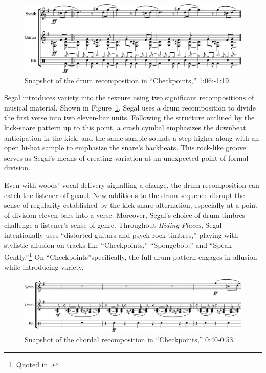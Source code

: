     \begin{figure}[ht]
        \centering
        \includegraphics[width=\textwidth]{images/figures/chp 02/106119checkpointsmain.pdf}
        \caption{Snapshot of the drum recomposition in ``Checkpoints,'' 1:06:-1:19.}
        \label{fig:checkpointsmain}
    \end{figure}

Segal introduces variety into the texture using two significant recompositions of musical material. Shown in Figure~\ref{fig:checkpointsmain}, Segal uses a drum recomposition to divide the first verse into two eleven-bar units. Following the structure outlined by the kick-snare pattern up to this point, a crash cymbal emphasizes the downbeat anticipation in the kick, and the same sample sounds a step higher along with an open hi-hat sample to emphasize the snare's backbeats. This rock-like groove serves as Segal's means of creating variation at an unexpected point of formal division.

Even with woods' vocal delivery signalling a change, the drum recomposition can catch the listener off-guard. New additions to the drum sequence disrupt the sense of regularity established by the kick-snare alternation, especially at a point of division eleven bars into a verse. Moreover, Segal's choice of drum timbres challenge a listener's sense of genre. Throughout \emph{Hiding Places}, Segal intentionally uses ``distorted guitars and psych-rock timbres,'' playing with stylistic allusion on tracks like ``Checkpoints,'' ``Spongebob,'' and ``Speak Gently.''\footnote{Quoted in \cite{backwoodzhiphopKennySegalPresents2019}.} On ``Checkpoints''specifically, the full drum pattern engages in allusion while introducing variety.

    \begin{figure}[ht]
        \centering
        \includegraphics[width=\textwidth]{images/figures/chp 02/040053checkpointsrecomp.pdf}
        \caption{Snapshot of the chordal recomposition in ``Checkpoints,'' 0:40-0:53.}
        \label{fig:checkpointsrecomp}
    \end{figure}

